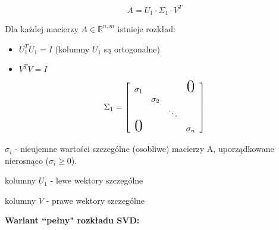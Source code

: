 \documentclass[hidelinks,a4paper,fleqn]{article}
\newcommand{\RR}{\mathbb{R}}
\newcommand{\eye}{I}
\begin{document}
\[
	A = U_1 \cdot \Sigma_1 \cdot V^T 
\]

Dla każdej macierzy $A \in \RR^{n, m}$ istnieje rozkład:
\begin{itemize}
  \item $U_1^TU_1 = \eye$ (kolumny $U_1$ są ortogonalne)
  \item $V^TV = I$
\end{itemize}

\[
\Sigma_1 = \left[\begin{array}{cccc} \sigma_1 & & & \text{\huge 0} \\
 & \sigma_2 & & \\ & & \ddots & \\ \text{\huge 0} & & & \sigma_n \end{array}\right]
\]

$\sigma _{i}$ - nieujemne wartości szczególne (osobliwe) macierzy A, uporządkowane nierosnąco ($\sigma_{i} \geq 0$).

kolumny $U_1$ - lewe wektory szczególne

kolumny $V$ - prawe wektory szczególne

\textbf{Wariant ``pełny" rozkładu SVD:}

\end{document}
